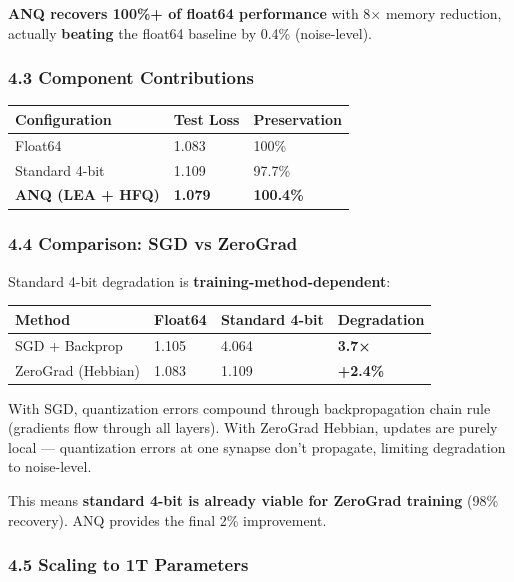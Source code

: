 \documentclass[
  11pt,
  a4paper,
]{article}
\begin{document}
\textbf{ANQ recovers 100\%+ of float64 performance} with 8× memory
reduction, actually \textbf{beating} the float64 baseline by 0.4\%
(noise-level).

\subsubsection{4.3 Component
Contributions}\label{component-contributions}

\begin{longtable}[]{@{}lll@{}}
\toprule\noalign{}
Configuration & Test Loss & Preservation \\
\midrule\noalign{}
\endhead
\bottomrule\noalign{}
\endlastfoot
Float64 & 1.083 & 100\% \\
Standard 4-bit & 1.109 & 97.7\% \\
\textbf{ANQ (LEA + HFQ)} & \textbf{1.079} & \textbf{100.4\%} \\
\end{longtable}

\subsubsection{4.4 Comparison: SGD vs
ZeroGrad}\label{comparison-sgd-vs-zerograd}

Standard 4-bit degradation is \textbf{training-method-dependent}:

\begin{longtable}[]{@{}llll@{}}
\toprule\noalign{}
Method & Float64 & Standard 4-bit & Degradation \\
\midrule\noalign{}
\endhead
\bottomrule\noalign{}
\endlastfoot
SGD + Backprop & 1.105 & 4.064 & \textbf{3.7×} \\
ZeroGrad (Hebbian) & 1.083 & 1.109 & \textbf{+2.4\%} \\
\end{longtable}

With SGD, quantization errors compound through backpropagation chain
rule (gradients flow through all layers). With ZeroGrad Hebbian, updates
are purely local --- quantization errors at one synapse don't propagate,
limiting degradation to noise-level.

This means \textbf{standard 4-bit is already viable for ZeroGrad
training} (98\% recovery). ANQ provides the final 2\% improvement.

\subsubsection{4.5 Scaling to 1T
Parameters}\label{scaling-to-1t-parameters}
\end{document}

